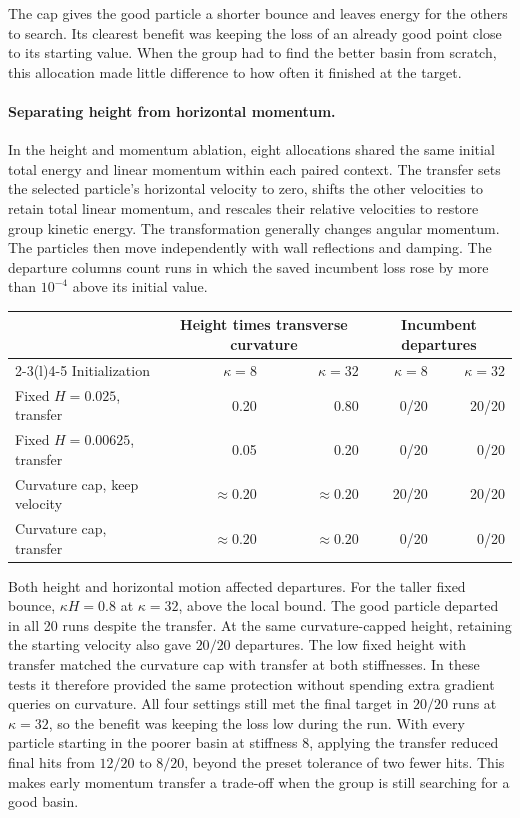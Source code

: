 \documentclass[10pt,letterpaper]{article}
\begin{document}
The cap gives the good particle a shorter bounce and leaves energy for the others to search. Its clearest benefit was keeping the loss of an already good point close to its starting value. When the group had to find the better basin from scratch, this allocation made little difference to how often it finished at the target.

\clearpage
\paragraph{Separating height from horizontal momentum.}
In the height and momentum ablation, eight allocations shared the same initial total energy and linear momentum within each paired context. The transfer sets the selected particle's horizontal velocity to zero, shifts the other velocities to retain total linear momentum, and rescales their relative velocities to restore group kinetic energy. The transformation generally changes angular momentum. The particles then move independently with wall reflections and damping. The departure columns count runs in which the saved incumbent loss rose by more than \(10^{-4}\) above its initial value.

\begin{center}
\small
\begin{tabular}{@{}lrrrr@{}}
\toprule
 & \multicolumn{2}{c}{Height times transverse curvature}
 & \multicolumn{2}{c}{Incumbent departures}\\
\cmidrule(lr){2-3}\cmidrule(l){4-5}
Initialization & \(\kappa=8\)& \(\kappa=32\)& \(\kappa=8\)& \(\kappa=32\)\\
\midrule
Fixed \(H=0.025\), transfer & 0.20 & 0.80 & 0/20 & 20/20\\
Fixed \(H=0.00625\), transfer & 0.05 & 0.20 & 0/20 & 0/20\\
Curvature cap, keep velocity & \(\approx0.20\)&\(\approx0.20\)&20/20&20/20\\
Curvature cap, transfer & \(\approx0.20\)&\(\approx0.20\)&0/20&0/20\\
\bottomrule
\end{tabular}
\end{center}
Both height and horizontal motion affected departures. For the taller fixed bounce, \(\kappa H=0.8\) at \(\kappa=32\), above the local bound. The good particle departed in all 20 runs despite the transfer. At the same curvature-capped height, retaining the starting velocity also gave \(20/20\) departures. The low fixed height with transfer matched the curvature cap with transfer at both stiffnesses. In these tests it therefore provided the same protection without spending extra gradient queries on curvature. All four settings still met the final target in \(20/20\) runs at \(\kappa=32\), so the benefit was keeping the loss low during the run. With every particle starting in the poorer basin at stiffness 8, applying the transfer reduced final hits from \(12/20\) to \(8/20\), beyond the preset tolerance of two fewer hits. This makes early momentum transfer a trade-off when the group is still searching for a good basin.
\end{document}
